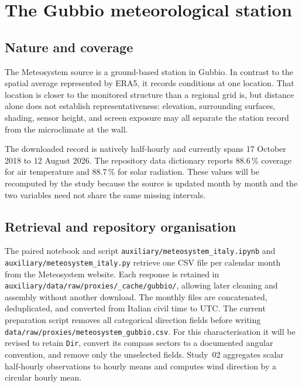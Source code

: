 \documentclass[11pt,a4paper]{article}
\begin{document}
\section{The Gubbio meteorological station}
\label{sec:ground_station}

\subsection{Nature and coverage}

The Meteosystem source is a ground-based station in Gubbio. In contrast to the
spatial average represented by ERA5, it records conditions at one location.
That location is closer to the monitored structure than a regional grid is, but
distance alone does not establish representativeness: elevation, surrounding
surfaces, shading, sensor height, and screen exposure may all separate the
station record from the microclimate at the wall.

The downloaded record is natively half-hourly and currently spans 17 October
2018 to 12 August 2026. The repository data dictionary reports 88.6\,\% coverage
for air temperature and 88.7\,\% for solar radiation. These values will be
recomputed by the study because the source is updated month by month and the two
variables need not share the same missing intervals.


\subsection{Retrieval and repository organisation}

The paired notebook and script \texttt{auxiliary/meteosystem\_italy.ipynb} and
\texttt{auxiliary/meteosystem\_italy.py} retrieve one CSV file per calendar
month from the Meteosystem website. Each response is retained in
\texttt{auxiliary/data/raw/proxies/\_cache/gubbio/}, allowing later cleaning and
assembly without another download. The monthly files are concatenated,
deduplicated, and converted from Italian civil time to UTC. The current
preparation script removes all categorical direction fields before writing
\texttt{data/raw/proxies/meteosystem\_gubbio.csv}. For this characterisation it
will be revised to retain \texttt{Dir}, convert its compass sectors to a
documented angular convention, and remove only the unselected fields. Study~02
aggregates scalar half-hourly observations to hourly means and computes wind
direction by a circular hourly mean.
\end{document}
